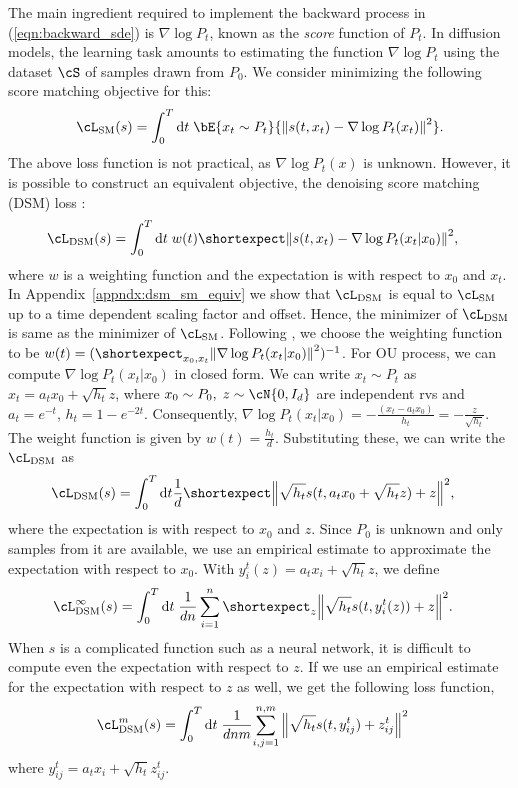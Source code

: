The main ingredient required to implement the backward process in (\ref{eqn:backward_sde}) is $\nabla\log P_t$, known as the \textit{score} function of $P_t$. In diffusion models, the learning task amounts to estimating the function $\nabla\log P_t$ using the dataset $\cS$ of samples drawn from $P_0$. We consider minimizing the following score matching \cite{hyvarinen_estimation_2005} objective for this:
\begin{equation*}
    \cL_{\text{SM}}(s) = \int_0^T  \dd t \; \bE{x_t\sim P_t}{\norm{s(t,x_t)-\nabla\log P_t(x_t)}^2} .
\end{equation*}
The above loss function is not practical, as $\nabla\log P_t(x)$ is unknown. However, it is possible to construct an equivalent objective, the denoising score matching (DSM) loss \cite{vincent_connection_2011}:
\begin{align*}
    \cL_{\text{DSM}}(s) &= \int_0^T  \dd t \; w(t)\shortexpect\norm{s(t,x_t)-\nabla\log P_t(x_t|x_0)}^2 ,
\end{align*}
where $w$ is a weighting function and the expectation is with respect to $x_0$ and $x_t$. 
In Appendix~\ref{appndx:dsm_sm_equiv} we show that $\cL_{\text{DSM}}$ is equal to $\cL_{\text{SM}}$ up to a time dependent scaling factor and offset. Hence, the minimizer of $\cL_{\text{DSM}}$ is same as the minimizer of $\cL_{\text{SM}}$. Following \cite{song_score-based_2020}, we choose the weighting function to be $w(t) = (\shortexpect_{x_0,x_t}{\norm{\nabla\log P_t(x_t|x_0)}^2})^{-1}$.
For OU process, we can compute $\nabla\log P_t(x_t|x_0)$ in closed form. We can write $x_t\sim P_t$ as  $x_t = a_t x_0+\sqrt{h_t}z$, where $x_0\sim P_0,\; z\sim\cN{0,I_d}$ are independent rvs and $a_t=e^{-t}$,\; $h_t=1-e^{-2t}$. Consequently, $\nabla\log P_t(x_t|x_0) = -\frac{(x_t-a_tx_0)}{h_t}=-\frac{z}{\sqrt{h_t}}$. The weight function is given by $w(t)=\frac{h_t}{d}$. Substituting these, we can write the $\cL_{\text{DSM}}$ as
\begin{align*}
    \cL_{\text{DSM}}(s) &= \int_0^T  \dd t  \frac{1}{d}\shortexpect\norm{\sqrt{h_t}s(t,a_tx_0+\sqrt{h_t}z)+z}^2,
\end{align*}
where the expectation is with respect to $x_0$ and $z$. Since $P_0$ is unknown and only samples from it are available, we use an empirical estimate to approximate the expectation with respect to $x_0$. With $y_i^t(z)=a_tx_i+\sqrt{h_t}z$, we define
\begin{align}\label{eqn:dsm_minf}
    \cL_{\text{DSM}}^\infty(s) &= \int_0^T \dd t \; \frac{1}{dn}\sum_{i=1}^{n}{\shortexpect_{z}{\norm{\sqrt{h_t}s(t,y_i^t(z))+z}^2}} .
\end{align}
When $s$ is a complicated function such as a neural network, it is difficult to compute even the expectation with respect to $z$. If we use an empirical estimate for the expectation with respect to $z$ as well, we get the following loss function, 
\begin{align}\label{eqn:dsm_mfinite}
    \cL_{\text{DSM}}^m(s) &= \int_0^T \dd t \; \frac{1}{dnm}{\sum_{i,j=1}^{n,m}\norm{\sqrt{h_t}s(t,y^t_{ij})+z^t_{ij}}^2} 
\end{align}
where $y^t_{ij} = a_tx_i+\sqrt{h_t}z^t_{ij}$.
